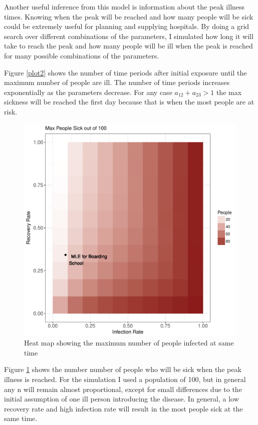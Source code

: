 \documentclass{svproc}
\begin{document}
Another useful inference from this model is information about the peak illness times. Knowing when the peak will be reached and how many people will be sick could be extremely useful for planning and supplying hospitals. By doing a grid search over different combinations of the parameters, I simulated how long it will take to reach the peak and how many people will be ill when the peak is reached for many possible combinations of the parameters. 


Figure \ref{plot2} shows the number of time periods after initial exposure until the maximum number of people are ill. The number of time periods increases exponentially as the parameters decrease. For any case $a_{12}+a_{23}>1$ the max sickness will be reached the first day because that is when the most people are at risk. 

\begin{figure}
\centering
\includegraphics[scale=.7]{MaxGrid.pdf}
\caption{Heat map showing the maximum number of people infected at same time}
\label{plot3}
\end{figure}

Figure \ref{plot3} shows the number number of people who will be sick when the peak illness is reached. For the simulation I used a population of 100, but in general any n will remain almost proportional, except for small differences due to the initial assumption of one ill person introducing the disease. In general, a low recovery rate and high infection rate will result in the most people sick at the same time.
\end{document}
